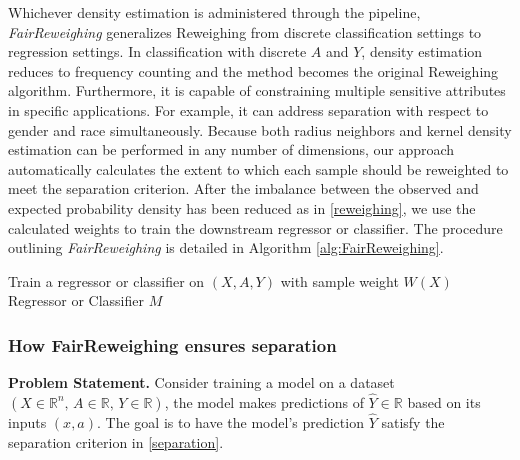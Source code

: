 Whichever density estimation is administered through the pipeline, \emph{FairReweighing} generalizes Reweighing from discrete classification settings to regression settings. In classification with discrete $A$ and $Y$, density estimation reduces to frequency counting and the method becomes the original Reweighing algorithm. Furthermore, it is capable of constraining multiple sensitive attributes in specific applications. For example, it can address separation with respect to gender and race simultaneously. Because both radius neighbors and kernel density estimation can be performed in any number of dimensions, our approach automatically calculates the extent to which each sample should be reweighted to meet the separation criterion. 
After the imbalance between the observed and expected probability density has been reduced as in \eqref{reweighing}, we use the calculated weights to train the downstream regressor or classifier. The procedure outlining \emph{FairReweighing} is detailed in Algorithm \ref{alg:FairReweighing}.
\begin{algorithm}
\DontPrintSemicolon 
{}
Train a regressor or classifier on $(X,A,Y)$ with sample weight $W(X)$\;
\Return Regressor or Classifier $M$
\caption{\emph{FairReweighing}}\label{alg:FairReweighing}
\end{algorithm}

\subsubsection{How FairReweighing ensures separation}\label{sec:proof}

\textbf{Problem Statement.} Consider training a model on a dataset $(X\in \mathbb{R}^n,\,A\in \mathbb{R},\,Y\in \mathbb{R})$, the model makes predictions of $\hat{Y}\in \mathbb{R}$ based on its inputs $(x,a)$. The goal is to have the model's prediction $\hat{Y}$ satisfy the separation criterion in \eqref{separation}.

